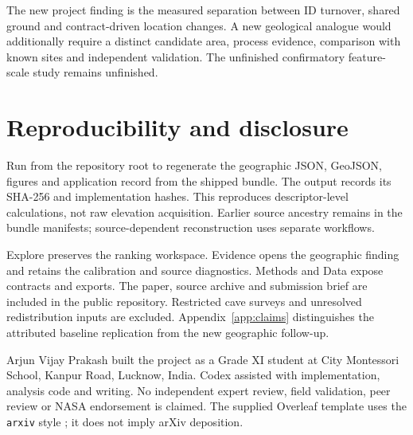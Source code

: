 The new project finding is the measured separation between ID turnover, shared ground and contract-driven location changes. A new geological analogue would additionally require a distinct candidate area, process evidence, comparison with known sites and independent validation. The unfinished confirmatory feature-scale study remains unfinished.

\section{Reproducibility and disclosure}
Run  from the repository root to regenerate the geographic JSON, GeoJSON, figures and application record from the shipped bundle. The output records its SHA-256 and implementation hashes. This reproduces descriptor-level calculations, not raw elevation acquisition. Earlier source ancestry remains in the bundle manifests; source-dependent reconstruction uses separate workflows.

Explore preserves the ranking workspace. Evidence opens the geographic finding and retains the calibration and source diagnostics. Methods and Data expose contracts and exports. The paper, source archive and submission brief are included in the public repository. Restricted cave surveys and unresolved redistribution inputs are excluded. Appendix~\ref{app:claims} distinguishes the attributed baseline replication from the new geographic follow-up.

Arjun Vijay Prakash built the project as a Grade XI student at City Montessori School, Kanpur Road, Lucknow, India. Codex assisted with implementation, analysis code and writing. No independent expert review, field validation, peer review or NASA endorsement is claimed. The supplied Overleaf template uses the \texttt{arxiv} style \cite{template}; it does not imply arXiv deposition.
